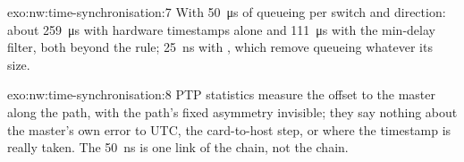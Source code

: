 \begin{solution}{exo:nw:time-synchronisation:7}
With \qty{50}{\micro\second} of queueing per switch and direction: about \qty{259}{\micro\second} with hardware timestamps alone and
\qty{111}{\micro\second} with the min-delay filter, both beyond the rule; \qty{25}{\nano\second} with , which remove
queueing whatever its size.
\end{solution}

\begin{solution}{exo:nw:time-synchronisation:8}
PTP statistics measure the offset to the master along the path, with the path's fixed asymmetry invisible; they say nothing about the
master's own error to UTC, the card-to-host step, or where the timestamp is really taken. The 50~ns is one link of the chain, not the
chain.
\end{solution}

